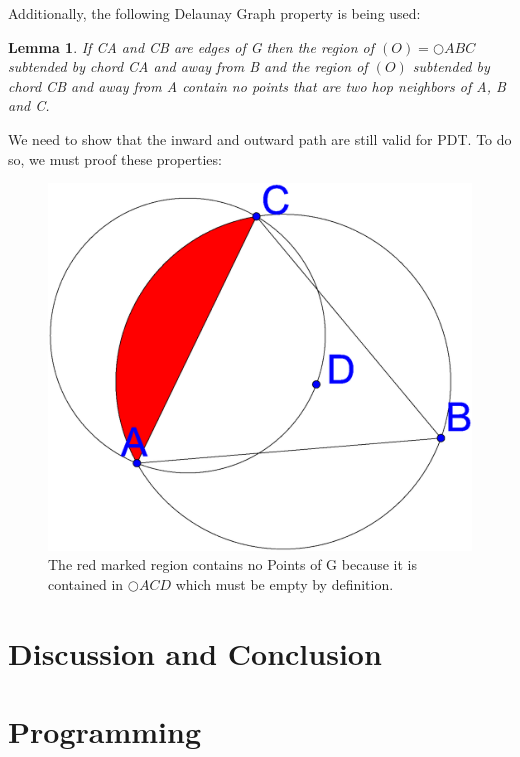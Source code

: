 \documentclass[a4paper,twoside, onecolumn]{IEEEtran}
\newtheorem{emptyregion}{Lemma}[section]
\begin{document}
Additionally, the following Delaunay Graph property is being used:
\begin{emptyregion}
\label{emptyregion}
If CA and CB are edges of G then the region of $(O)=\bigcirc{ABC} $ subtended by chord  CA and away from B and the region of $(O) $ subtended by chord CB and away from A contain no points that are two hop neighbors of A, B and C.
\end{emptyregion}



We need to show that the inward and outward path are still valid for PDT.
To do so, we must proof these properties:




\begin{figure}[h!]
\centering
\includegraphics[width=0.2\linewidth]{noPointinRegion.eps}
\caption{The red marked region contains no Points of G because it is contained in $\bigcirc{ACD} $ which must be empty by definition.}
\label{fig:region}
\end{figure}



\section{Discussion and Conclusion}

\section{Programming}



\end{document}
